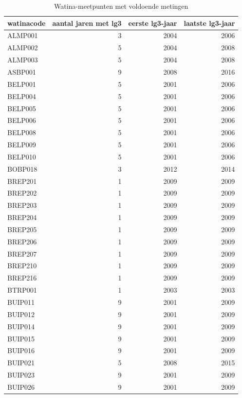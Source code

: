 \documentclass[11pt,]{book}
\begin{document}
\begin{table}

\caption{\label{tab:table-tubes-lg3}Watina-meetpunten met voldoende metingen}
\centering
\begin{tabular}[t]{l|r|r|r}
\hline
watinacode & aantal jaren met lg3 & eerste lg3-jaar & laatste lg3-jaar\\
\hline
ALMP001 & 3 & 2004 & 2006\\
\hline
ALMP002 & 5 & 2004 & 2008\\
\hline
ALMP003 & 5 & 2004 & 2008\\
\hline
ASBP001 & 9 & 2008 & 2016\\
\hline
BELP001 & 5 & 2001 & 2006\\
\hline
BELP004 & 5 & 2001 & 2006\\
\hline
BELP005 & 5 & 2001 & 2006\\
\hline
BELP006 & 5 & 2001 & 2006\\
\hline
BELP008 & 5 & 2001 & 2006\\
\hline
BELP009 & 5 & 2001 & 2006\\
\hline
BELP010 & 5 & 2001 & 2006\\
\hline
BOBP018 & 3 & 2012 & 2014\\
\hline
BREP201 & 1 & 2009 & 2009\\
\hline
BREP202 & 1 & 2009 & 2009\\
\hline
BREP203 & 1 & 2009 & 2009\\
\hline
BREP204 & 1 & 2009 & 2009\\
\hline
BREP205 & 1 & 2009 & 2009\\
\hline
BREP206 & 1 & 2009 & 2009\\
\hline
BREP207 & 1 & 2009 & 2009\\
\hline
BREP210 & 1 & 2009 & 2009\\
\hline
BREP216 & 1 & 2009 & 2009\\
\hline
BTRP001 & 1 & 2003 & 2003\\
\hline
BUIP011 & 9 & 2001 & 2009\\
\hline
BUIP012 & 9 & 2001 & 2009\\
\hline
BUIP014 & 9 & 2001 & 2009\\
\hline
BUIP015 & 9 & 2001 & 2009\\
\hline
BUIP016 & 9 & 2001 & 2009\\
\hline
BUIP021 & 5 & 2008 & 2015\\
\hline
BUIP023 & 9 & 2001 & 2009\\
\hline
BUIP026 & 9 & 2001 & 2009\\

\end{tabular}
\end{table}
\end{document}
